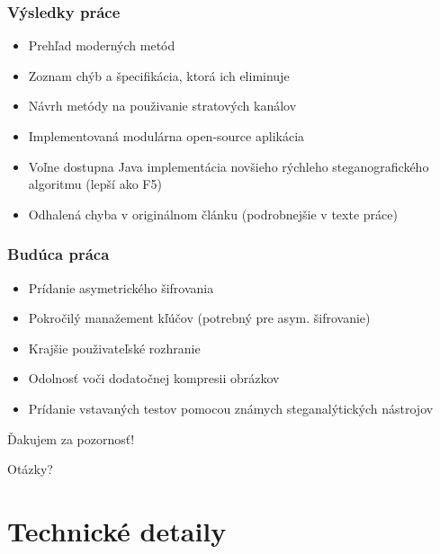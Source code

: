 \documentclass{beamer}
\begin{document}
\begin{frame}
    \frametitle{Výsledky práce}
    \begin{itemize}
        \item Prehľad moderných metód
        \item Zoznam chýb a špecifikácia, ktorá ich eliminuje
        \item Návrh metódy na použivanie stratových kanálov
        \item Implementovaná modulárna open-source aplikácia
        \item Voľne dostupna Java implementácia novšieho rýchleho steganografického algoritmu (lepší ako F5)
        \item Odhalená chyba v originálnom článku (podrobnejšie v texte práce)
    \end{itemize}
    
\end{frame}


\begin{frame}
    \frametitle{Budúca práca}
    \begin{itemize}
        \item Prídanie asymetrického šifrovania
        \item Pokročilý manažement kľúčov (potrebný pre asym. šifrovanie)
        \item Krajšie použivateľské rozhranie
        \item Odolnosť voči dodatočnej kompresii obrázkov
        \item Prídanie vstavaných testov pomocou známych steganalýtických nástrojov
    \end{itemize}
    
\end{frame}

\begin{frame}
    \begin{center}
        \Large Ďakujem za pozornosť!
    \end{center}
\end{frame}

\begin{frame}
    \begin{center}
        \Large
        Otázky?
    \end{center}
\end{frame}

\section{Technické detaily}
\end{document}
